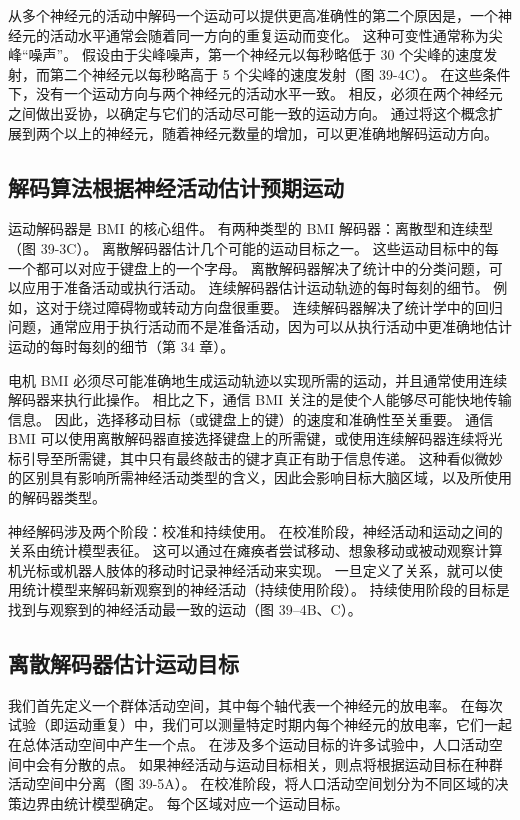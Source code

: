 从多个神经元的活动中解码一个运动可以提供更高准确性的第二个原因是，一个神经元的活动水平通常会随着同一方向的重复运动而变化。 这种可变性通常称为尖峰“噪声”。 假设由于尖峰噪声，第一个神经元以每秒略低于 30 个尖峰的速度发射，而第二个神经元以每秒略高于 5 个尖峰的速度发射（图 39-4C）。 在这些条件下，没有一个运动方向与两个神经元的活动水平一致。 相反，必须在两个神经元之间做出妥协，以确定与它们的活动尽可能一致的运动方向。 通过将这个概念扩展到两个以上的神经元，随着神经元数量的增加，可以更准确地解码运动方向。

\subsection{解码算法根据神经活动估计预期运动}
运动解码器是 BMI 的核心组件。 有两种类型的 BMI 解码器：离散型和连续型（图 39-3C）。 离散解码器估计几个可能的运动目标之一。 这些运动目标中的每一个都可以对应于键盘上的一个字母。 离散解码器解决了统计中的分类问题，可以应用于准备活动或执行活动。 连续解码器估计运动轨迹的每时每刻的细节。 例如，这对于绕过障碍物或转动方向盘很重要。 连续解码器解决了统计学中的回归问题，通常应用于执行活动而不是准备活动，因为可以从执行活动中更准确地估计运动的每时每刻的细节（第 34 章）。

电机 BMI 必须尽可能准确地生成运动轨迹以实现所需的运动，并且通常使用连续解码器来执行此操作。 相比之下，通信 BMI 关注的是使个人能够尽可能快地传输信息。 因此，选择移动目标（或键盘上的键）的速度和准确性至关重要。 通信 BMI 可以使用离散解码器直接选择键盘上的所需键，或使用连续解码器连续将光标引导至所需键，其中只有最终敲击的键才真正有助于信息传递。 这种看似微妙的区别具有影响所需神经活动类型的含义，因此会影响目标大脑区域，以及所使用的解码器类型。

神经解码涉及两个阶段：校准和持续使用。 在校准阶段，神经活动和运动之间的关系由统计模型表征。 这可以通过在瘫痪者尝试移动、想象移动或被动观察计算机光标或机器人肢体的移动时记录神经活动来实现。 一旦定义了关系，就可以使用统计模型来解码新观察到的神经活动（持续使用阶段）。 持续使用阶段的目标是找到与观察到的神经活动最一致的运动（图 39–4B、C）。



\subsection{离散解码器估计运动目标}
我们首先定义一个群体活动空间，其中每个轴代表一个神经元的放电率。 在每次试验（即运动重复）中，我们可以测量特定时期内每个神经元的放电率，它们一起在总体活动空间中产生一个点。 在涉及多个运动目标的许多试验中，人口活动空间中会有分散的点。 如果神经活动与运动目标相关，则点将根据运动目标在种群活动空间中分离（图 39-5A）。 在校准阶段，将人口活动空间划分为不同区域的决策边界由统计模型确定。 每个区域对应一个运动目标。


